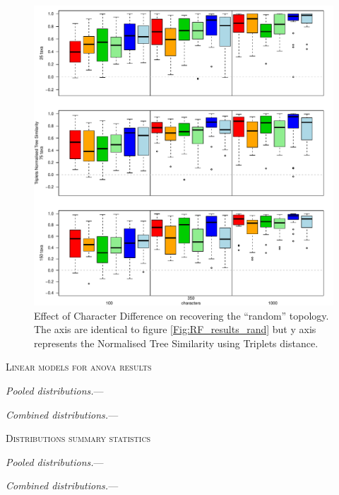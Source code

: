 \documentclass[12pt,letterpaper]{article}
\renewcommand{\section}[1]{%
\bigskip
\begin{center}
\begin{Large}
\normalfont\scshape #1
\medskip
\end{Large}
\end{center}}
\renewcommand{\subsection}[1]{%
\bigskip
\begin{center}
\begin{large}
\normalfont\itshape #1
\end{large}
\end{center}}
\renewcommand{\subsection}[1]{%
\vspace{2ex}
\noindent
\textit{#1.}---}
\begin{document}
\begin{figure}[!htbp]
\centering
   \includegraphics[width=1\textwidth]{../Figures/Tr_results_null.pdf} %
\caption{Effect of Character Difference on recovering the ``random'' topology. The axis are identical to figure \ref{Fig:RF_results_rand} but y axis represents the Normalised Tree Similarity using Triplets distance.}
\label{Fig:Tr_results_rand}
\end{figure}


\section{Linear models for anova results}

\subsection{Pooled distributions}

\subsection{Combined distributions}


\section{Distributions summary statistics}

\subsection{Pooled distributions}

\subsection{Combined distributions}
\end{document}
